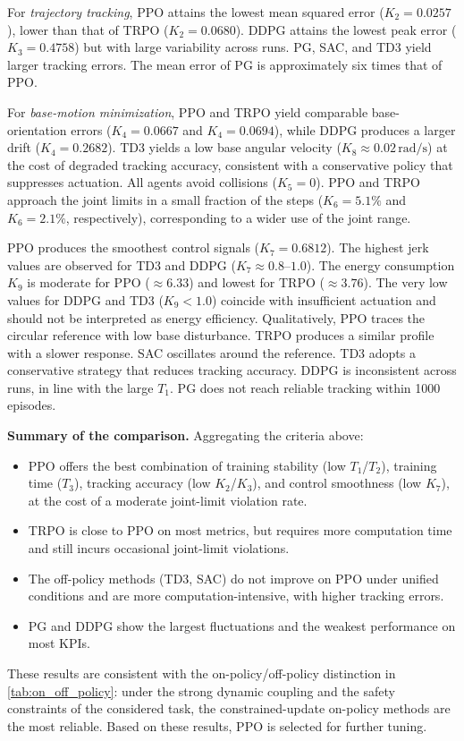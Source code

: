 \documentclass{ieeeaccess}
\begin{document}
For \emph{trajectory tracking}, PPO attains the lowest mean squared error ($K_2 = 0.0257$), lower
than that of TRPO ($K_2 = 0.0680$). DDPG attains the lowest peak error ($K_3 = 0.4758$)
but with large variability across runs. PG, SAC, and TD3 yield larger tracking errors.
The mean error of PG is approximately six times that of PPO.

For \emph{base-motion minimization}, PPO and TRPO yield comparable base-orientation errors ($K_4 = 0.0667$ and
$K_4 = 0.0694$), while DDPG produces a larger drift ($K_4 = 0.2682$). TD3 yields
a low base angular velocity ($K_8 \approx 0.02\,\mathrm{rad/s}$) at the cost of degraded tracking
accuracy, consistent with a conservative policy that suppresses actuation. All agents avoid collisions ($K_5 = 0$).
PPO and TRPO approach the joint limits in a small fraction of the steps
($K_6 = 5.1\%$ and $K_6 = 2.1\%$, respectively), corresponding to a wider use of
the joint range.

PPO produces the smoothest control signals ($K_7 = 0.6812$). The highest jerk values are
observed for TD3 and DDPG ($K_7 \approx 0.8$--$1.0$). The energy consumption $K_9$ is moderate
for PPO ($\approx 6.33$) and lowest for TRPO ($\approx 3.76$). The very low values
for DDPG and TD3 ($K_9 < 1.0$) coincide with insufficient actuation and should not
be interpreted as energy efficiency. Qualitatively, PPO traces the circular reference with low base
disturbance. TRPO produces a similar profile with a slower response. SAC oscillates around the
reference. TD3 adopts a conservative strategy that reduces tracking accuracy. DDPG is inconsistent across
runs, in line with the large $T_1$. PG does not reach reliable tracking within
1000 episodes.

\textbf{Summary of the comparison.} Aggregating the criteria above:
\begin{itemize}
        \item PPO offers the best combination of training stability (low $T_1$/$T_2$), training time ($T_3$),
        tracking accuracy (low $K_2$/$K_3$), and control smoothness (low $K_7$), at the cost of a
        moderate joint-limit violation rate.
        \item TRPO is close to PPO on most metrics, but requires more computation time
        and still incurs occasional joint-limit violations.
        \item The off-policy methods (TD3, SAC) do not improve on PPO under unified conditions
        and are more computation-intensive, with higher tracking errors.
        \item PG and DDPG show the largest fluctuations and the weakest performance on most
        KPIs.
\end{itemize}
These results are consistent with the on-policy/off-policy distinction in \autoref{tab:on_off_policy}: under the strong dynamic
coupling and the safety constraints of the considered task, the constrained-update on-policy methods are
the most reliable. Based on these results, PPO is selected for further tuning.
\end{document}

